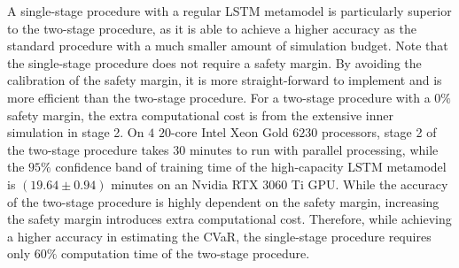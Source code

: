 A single-stage procedure with a regular LSTM metamodel is particularly superior to the two-stage procedure, as it is able to achieve a higher accuracy as the standard procedure with a much smaller amount of simulation budget.
Note that the single-stage procedure does not require a safety margin.
By avoiding the calibration of the safety margin, it is more straight-forward to implement and is more efficient than the two-stage procedure.
For a two-stage procedure with a $0\%$ safety margin, the extra computational cost is from the extensive inner simulation in stage 2.
On $4$ $20$-core Intel Xeon Gold $\num{6230}$ processors, stage 2 of the two-stage procedure takes $30$ minutes to run with parallel processing, while the $95\%$ confidence band of training time of the high-capacity LSTM metamodel is $(19.64 \pm 0.94)$ minutes on an Nvidia RTX $\num{3060}$ Ti GPU.
While the accuracy of the two-stage procedure is highly dependent on the safety margin, increasing the safety margin introduces extra computational cost.
Therefore, while achieving a higher accuracy in estimating the CVaR, the single-stage procedure requires only $60\%$ computation time of the two-stage procedure.

